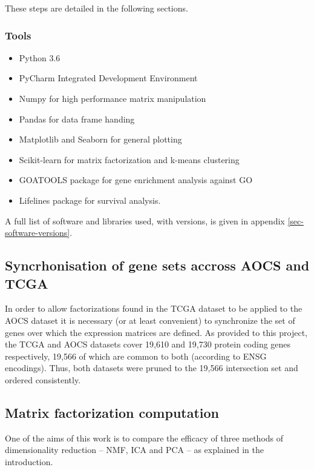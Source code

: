 \documentclass[draft,tikz, 12pt,a4paper,oneside,fleqn]{article}
\begin{document}
These steps are detailed in the following sections.

\FloatBarrier

\subsubsection{Tools}
\begin{itemize}
\itemsep -0.5em 
\item Python 3.6
\item PyCharm Integrated Development Environment
\item Numpy for high performance matrix manipulation
\item Pandas for data frame handing
\item Matplotlib and Seaborn for general plotting
\item Scikit-learn for matrix factorization and k-means clustering
\item GOATOOLS package for gene enrichment analysis against GO
\item Lifelines package for survival analysis.
\end{itemize}
A full list of software and libraries used, with versions, is given in appendix \ref{sec-software-versions}.

\subsection{Syncrhonisation of gene sets accross AOCS and TCGA}
\label{sec:gene-set-intersection}

In order to allow factorizations found in the TCGA dataset to be applied to the AOCS dataset it is necessary (or at least convenient) to synchronize the set of genes over which the expression matrices are defined.   As provided to this project, the TCGA and AOCS datasets cover 19,610 and 19,730 protein coding genes respectively, 19,566 of which are common to both (according to ENSG encodings).  Thus, both datasets were pruned to the 19,566 intersection set and ordered consistently.

\subsection{Matrix factorization computation}
One of the aims of this work is to compare the efficacy of three methods of dimensionality reduction -- NMF, ICA and PCA -- as explained in the introduction.   
\end{document}
